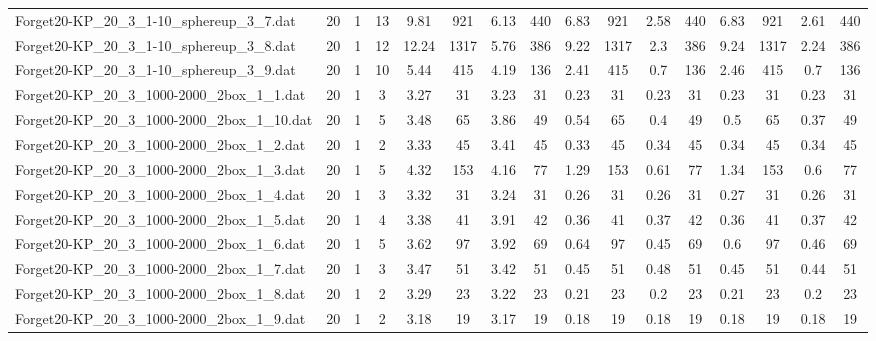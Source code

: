 \begin{sidewaystable}[!ht]
{\begin{tabular}{lccccccccccccccc}
Forget20-KP\_20\_3\_1-10\_sphereup\_3\_7.dat & 20 & 1 & 13 & 9.81 & 921 & 6.13 & 440 & 6.83 & 921 & 2.58 & 440 & 6.83 & 921 & 2.61 & 440 \\
Forget20-KP\_20\_3\_1-10\_sphereup\_3\_8.dat & 20 & 1 & 12 & 12.24 & 1317 & 5.76 & 386 & 9.22 & 1317 & 2.3 & 386 & 9.24 & 1317 & 2.24 & 386 \\
Forget20-KP\_20\_3\_1-10\_sphereup\_3\_9.dat & 20 & 1 & 10 & 5.44 & 415 & 4.19 & 136 & 2.41 & 415 &  \textcolor{blue2}{0.7} & 136 & 2.46 & 415 &  \textcolor{blue2}{0.7} & 136 \\
Forget20-KP\_20\_3\_1000-2000\_2box\_1\_1.dat & 20 & 1 & 3 & 3.27 & 31 & 3.23 & 31 &  \textcolor{blue2}{0.23} & 31 &  \textcolor{blue2}{0.23} & 31 &  \textcolor{blue2}{0.23} & 31 &  \textcolor{blue2}{0.23} & 31 \\
Forget20-KP\_20\_3\_1000-2000\_2box\_1\_10.dat & 20 & 1 & 5 & 3.48 & 65 & 3.86 & 49 & 0.54 & 65 & 0.4 & 49 & 0.5 & 65 &  \textcolor{blue2}{0.37} & 49 \\
Forget20-KP\_20\_3\_1000-2000\_2box\_1\_2.dat & 20 & 1 & 2 & 3.33 & 45 & 3.41 & 45 &  \textcolor{blue2}{0.33} & 45 & 0.34 & 45 & 0.34 & 45 & 0.34 & 45 \\
Forget20-KP\_20\_3\_1000-2000\_2box\_1\_3.dat & 20 & 1 & 5 & 4.32 & 153 & 4.16 & 77 & 1.29 & 153 & 0.61 & 77 & 1.34 & 153 &  \textcolor{blue2}{0.6} & 77 \\
Forget20-KP\_20\_3\_1000-2000\_2box\_1\_4.dat & 20 & 1 & 3 & 3.32 & 31 & 3.24 & 31 &  \textcolor{blue2}{0.26} & 31 &  \textcolor{blue2}{0.26} & 31 & 0.27 & 31 &  \textcolor{blue2}{0.26} & 31 \\
Forget20-KP\_20\_3\_1000-2000\_2box\_1\_5.dat & 20 & 1 & 4 & 3.38 & 41 & 3.91 & 42 &  \textcolor{blue2}{0.36} & 41 & 0.37 & 42 &  \textcolor{blue2}{0.36} & 41 & 0.37 & 42 \\
Forget20-KP\_20\_3\_1000-2000\_2box\_1\_6.dat & 20 & 1 & 5 & 3.62 & 97 & 3.92 & 69 & 0.64 & 97 &  \textcolor{blue2}{0.45} & 69 & 0.6 & 97 & 0.46 & 69 \\
Forget20-KP\_20\_3\_1000-2000\_2box\_1\_7.dat & 20 & 1 & 3 & 3.47 & 51 & 3.42 & 51 & 0.45 & 51 & 0.48 & 51 & 0.45 & 51 &  \textcolor{blue2}{0.44} & 51 \\
Forget20-KP\_20\_3\_1000-2000\_2box\_1\_8.dat & 20 & 1 & 2 & 3.29 & 23 & 3.22 & 23 & 0.21 & 23 &  \textcolor{blue2}{0.2} & 23 & 0.21 & 23 &  \textcolor{blue2}{0.2} & 23 \\
Forget20-KP\_20\_3\_1000-2000\_2box\_1\_9.dat & 20 & 1 & 2 & 3.18 & 19 & 3.17 & 19 &  \textcolor{blue2}{0.18} & 19 &  \textcolor{blue2}{0.18} & 19 &  \textcolor{blue2}{0.18} & 19 &  \textcolor{blue2}{0.18} & 19 \\

\end{tabular}}
\end{sidewaystable}
